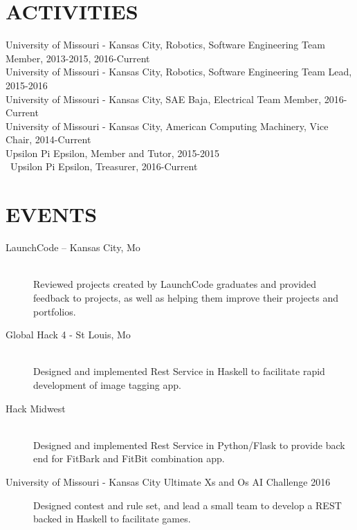 \documentclass[margin,10pt]{res} %
\begin{document}
\begin{resume}
 
\section{ACTIVITIES}
University of Missouri - Kansas City, Robotics, Software Engineering Team Member, 2013-2015, 2016-Current \\
University of Missouri - Kansas City, Robotics, Software Engineering Team Lead, 2015-2016 \\
University of Missouri - Kansas City, SAE Baja, Electrical Team Member, 2016-Current \\
University of Missouri - Kansas City, American Computing Machinery, Vice Chair, 2014-Current\\
Upsilon Pi Epsilon, Member and Tutor, 2015-2015 \\\
Upsilon Pi Epsilon, Treasurer, 2016-Current

\section{EVENTS}
\begin{description}
\item [LaunchCode -- Kansas City, Mo] \hfill \\
	Reviewed projects created by LaunchCode graduates and provided feedback to projects, as well as helping them improve their projects and portfolios.

\item [Global Hack 4 - St Louis, Mo] \hfill \\
   Designed and implemented Rest Service in Haskell to facilitate rapid development of image tagging app.

\item [Hack Midwest] \hfill \\
  Designed and implemented Rest Service in Python/Flask to provide back end for FitBark and FitBit combination app.

\item[University of Missouri - Kansas City Ultimate Xs and Os AI Challenge 2016]
	Designed contest and rule set, and lead a small team to develop a REST backed in Haskell to facilitate games.  

\end{description}
\end{resume} 
\end{document}
